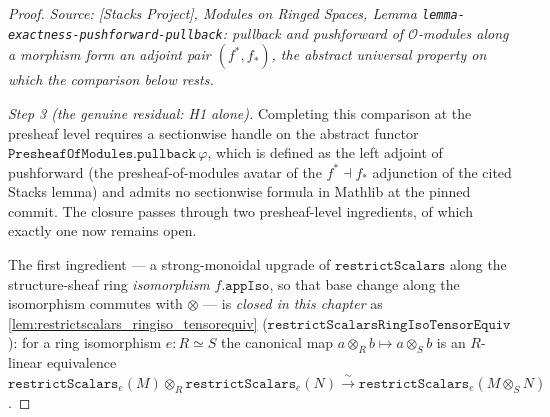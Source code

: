 \begin{proof}
  \textit{Source: [Stacks Project], Modules on Ringed Spaces, Lemma
  \texttt{lemma-exactness-pushforward-pullback}: pullback and pushforward of
  $\mathcal{O}$-modules along a morphism form an adjoint pair $(f^*, f_*)$, the
  abstract universal property on which the comparison below rests.}

  \emph{Step 3 (the genuine residual: H1 alone).} Completing this comparison at the
  presheaf level requires a sectionwise handle on the abstract functor
  \(\mathtt{PresheafOfModules.pullback}\,\varphi\), which is defined as the left
  adjoint of pushforward (the presheaf-of-modules avatar of the
  \(f^* \dashv f_*\) adjunction of the cited Stacks lemma) and admits no
  sectionwise formula in Mathlib at the pinned commit. The closure passes through
  two presheaf-level ingredients, of which exactly one now remains open.

  The first ingredient --- a strong-monoidal upgrade of
  \(\mathtt{restrictScalars}\) along the structure-sheaf ring \emph{isomorphism}
  \(f.\mathtt{appIso}\), so that base change along the isomorphism commutes with
  \(\otimes\) --- is \emph{closed in this chapter} as
  \cref{lem:restrictscalars_ringiso_tensorequiv}
  (\(\mathtt{restrictScalarsRingIsoTensorEquiv}\)): for a ring isomorphism
  \(e : R \simeq S\) the canonical map \(a \otimes_R b \mapsto a \otimes_S b\) is an
  \(R\)-linear equivalence \(\mathtt{restrictScalars}_e(M) \otimes_R
  \mathtt{restrictScalars}_e(N) \xrightarrow{\sim} \mathtt{restrictScalars}_e(M
  \otimes_S N)\).


\end{proof}
